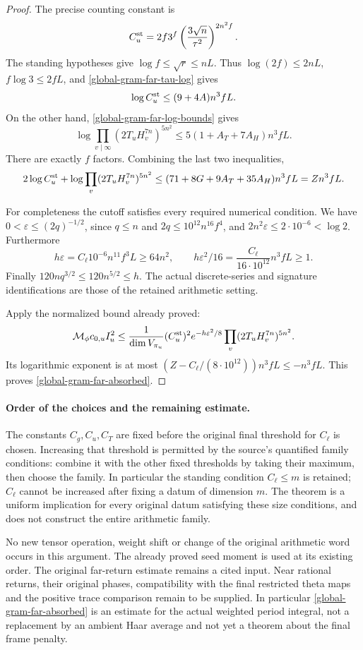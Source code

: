 \begin{proof}
The precise counting constant is
\[
 C^{\rm st}_u=2f3^f
       \left(\frac{3\sqrt n}{\tau^2}\right)^{2n^2f}.
\]
The standing hypotheses give $\log f\leq\sqrt r\leq nL$.
Thus $\log(2f)\leq2nL$, $f\log3\leq2fL$, and
\eqref{global-gram-far-tau-log} gives
\[
 \log C^{\rm st}_u\leq(9+4A)n^3fL.
\]
On the other hand, \eqref{global-gram-far-log-bounds} gives
\[
 \log\prod_{v\mid\infty}(2T_uH_v^{7n})^{5n^2}
 \leq 5(1+A_T+7A_H)n^3fL.
\]
There are exactly $f$ factors.  Combining the last two inequalities,
\begin{equation}\label{global-gram-far-total-positive}
 2\log C^{\rm st}_u+
 \log\prod_v(2T_uH_v^{7n})^{5n^2}
 \leq(71+8G+9A_T+35A_H)n^3fL=Zn^3fL.
\end{equation}

For completeness the cutoff satisfies every required numerical
condition.  We have $0<\varepsilon\leq(2q)^{-1/2}$, since
$q\leq n$ and $2q\leq10^{12}n^{16}f^4$, and
$2n^2\varepsilon\leq2\cdot10^{-6}<\log2$.
Furthermore
\[
 h\varepsilon=C_\ell10^{-6}n^{11}f^3L\geq64n^2,
 \qquad h\varepsilon^2/16
       =\frac{C_\ell}{16\cdot10^{12}}n^3fL\geq1.
\]
Finally $120nq^{3/2}\leq120n^{5/2}\leq h$.
The actual discrete-series and signature identifications are those
of the retained arithmetic setting.

Apply the normalized bound already proved:
\[
 \mathcal M_\phi c_{0,u}I_u^2
 \leq\frac1{\dim V_{\pi_u}}
    (C^{\rm st}_u)^2e^{-h\varepsilon^2/8}
               \prod_v(2T_uH_v^{7n})^{5n^2}.
\]
Its logarithmic exponent is at most
$(Z-C_\ell/(8\cdot10^{12}))n^3fL\leq-n^3fL$.
This proves \eqref{global-gram-far-absorbed}.
\end{proof}

\paragraph{Order of the choices and the remaining estimate.}
The constants $C_g,C_u,C_T$ are fixed before the original final
threshold for $C_\ell$ is chosen.  Increasing that threshold is
permitted by the source's quantified family conditions: combine it
with the other fixed thresholds by taking their maximum, then choose
the family.  In particular the standing condition $C_\ell\leq m$
is retained; $C_\ell$ cannot be increased after fixing a datum of
dimension $m$.  The theorem is a uniform implication for every
original datum satisfying these size conditions, and does not
construct the entire arithmetic family.
\cite{global-gram-far-source}

No new tensor operation, weight shift or change of the original
arithmetic word occurs in this argument.  The already proved seed
moment is used at its existing order.  The original far-return
estimate remains a cited input.  Near rational returns,
their original phases, compatibility with the final restricted
theta maps and the positive trace comparison remain to be supplied.
In particular \eqref{global-gram-far-absorbed} is an estimate for the
actual weighted period integral, not a replacement by an ambient
Haar average and not yet a theorem about the final frame penalty.
